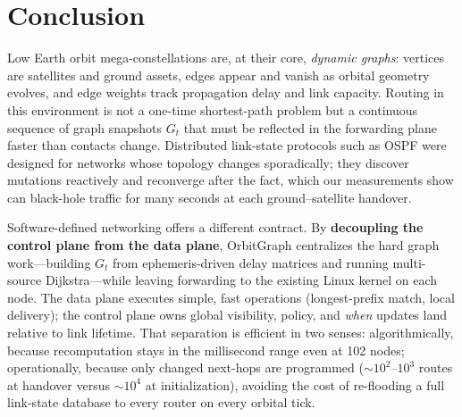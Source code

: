 
\section{Conclusion}
\label{sec:conclusion}

Low Earth orbit mega-constellations are, at their core, \emph{dynamic graphs}:
vertices are satellites and ground assets, edges appear and vanish as orbital
geometry evolves, and edge weights track propagation delay and link capacity.
Routing in this environment is not a one-time shortest-path problem but a
continuous sequence of graph snapshots $G_t$ that must be reflected in the
forwarding plane faster than contacts change.
Distributed link-state protocols such as OSPF were designed for networks whose
topology changes sporadically; they discover mutations reactively and
reconverge after the fact, which our measurements show can black-hole traffic
for many seconds at each ground--satellite handover.

Software-defined networking offers a different contract.
By \textbf{decoupling the control plane from the data plane}, OrbitGraph
centralizes the hard graph work---building $G_t$ from ephemeris-driven delay
matrices and running multi-source Dijkstra---while leaving forwarding to the
existing Linux kernel on each node.
The data plane executes simple, fast operations (longest-prefix match, local
delivery); the control plane owns global visibility, policy, and \emph{when}
updates land relative to link lifetime.
That separation is efficient in two senses: algorithmically, because
recomputation stays in the millisecond range even at 102 nodes; operationally,
because only changed next-hops are programmed (${\sim}10^2$–$10^3$ routes at
handover versus ${\sim}10^4$ at initialization), avoiding the cost of
re-flooding a full link-state database to every router on every orbital tick.

